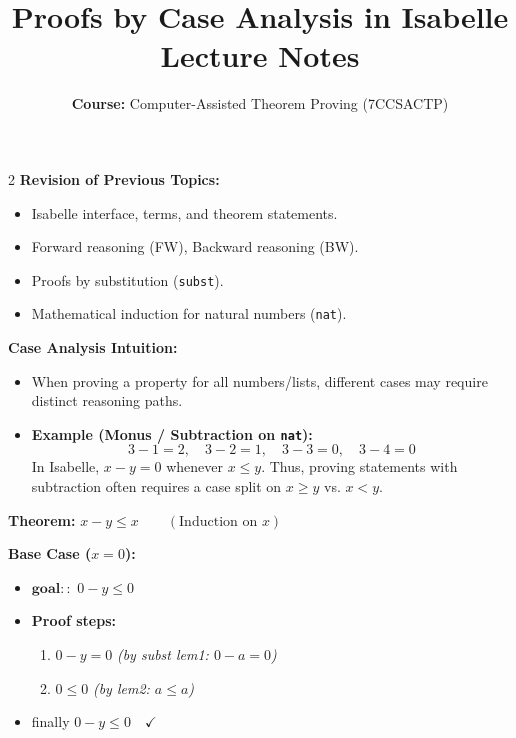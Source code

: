 \documentclass[10pt,a4paper]{article}
\title{\textbf{\huge Proofs by Case Analysis in Isabelle}\\[0.3em]
\large Lecture Notes}
\author{\textbf{Course:} Computer-Assisted Theorem Proving (7CCSACTP)}
\date{}
\begin{document}
\maketitle
\vspace{-1.5em}

\begin{tcolorbox}[title={1. Context \& Intuition}]
\begin{multicols}{2}
\textbf{Revision of Previous Topics:}
\begin{itemize}[leftmargin=1.2em, itemsep=2pt]
    \item Isabelle interface, terms, and theorem statements.
    \item Forward reasoning (FW), Backward reasoning (BW).
    \item Proofs by substitution (\texttt{subst}).
    \item Mathematical induction for natural numbers (\texttt{nat}).
\end{itemize}

\columnbreak

\textbf{Case Analysis Intuition:}
\begin{itemize}[leftmargin=1.2em, itemsep=2pt]
    \item When proving a property for all numbers/lists, different cases may require distinct reasoning paths.
    \item \textbf{Example (Monus / Subtraction on \texttt{nat}):}
    \[ 3 - 1 = 2, \quad 3 - 2 = 1, \quad 3 - 3 = 0, \quad 3 - 4 = 0 \]
    In Isabelle, $x - y = 0$ whenever $x \le y$. Thus, proving statements with subtraction often requires a case split on $x \ge y$ vs. $x < y$.
\end{itemize}
\end{multicols}
\end{tcolorbox}

\vspace{0.3em}

\begin{tcolorbox}[title={2. Worked Example: Proving $x - y \le x$}]
\textbf{Theorem:} $x - y \le x \qquad (\text{Induction on } x)$

\vspace{0.3em}
\textbf{Base Case ($x = 0$):}
\begin{itemize}[leftmargin=1.2em, itemsep=2pt]
    \item $\textbf{goal}::$ $0 - y \le 0$
    \item \textbf{Proof steps:}
    \begin{enumerate}[leftmargin=1.2em, itemsep=1pt]
        \item $0 - y = 0$ \quad \textit{(by subst lem1: $0 - a = 0$)}
        \item $0 \le 0$ \quad \textit{(by lem2: $a \le a$)}
    \end{enumerate}
    \item \textsf{finally} $0 - y \le 0 \quad \checkmark$
\end{itemize}
\end{tcolorbox}
\end{document}
